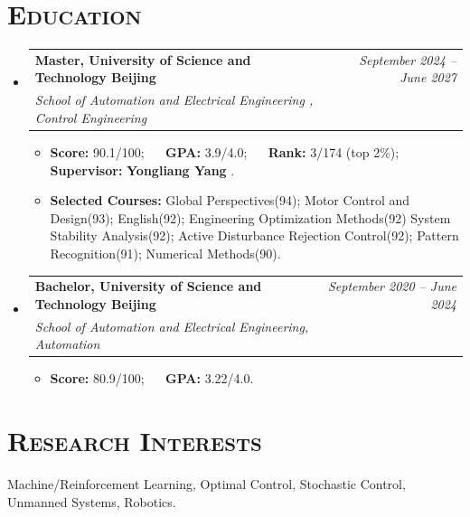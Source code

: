 \documentclass[a4paper,11pt]{article}
\makeatletter
\newcommand{\TT}[1]{\textcolor{black}{#1}}
\newcommand{\externallink}[2]{%
	#2\nobreak\hspace{0.16em}%
	\href{#1}{\textcolor{ExternalArrowColor}{%
			\faIcon{external-link-alt}}}%
}
\newcommand{\resumeItem}[1]{
  \item\small{
    {#1 \vspace{-1pt}}
  }
}
\newcommand{\resumeSubheading}[4]{
  \vspace{-1pt}\item
    \begin{tabular*}{\textwidth}[t]{l@{\extracolsep{\fill}}r}
      \textbf{#1} & {\color{dark-grey}\small #2}\vspace{1pt}\\
      \textit{#3} & {\color{dark-grey} \small #4}\\
    \end{tabular*}\vspace{-4pt}
}
\newcommand{\resumeSubHeadingListStart}{\begin{itemize}[leftmargin=0in, label={}]}
\newcommand{\resumeSubHeadingListEnd}{\end{itemize}}
\newcommand{\resumeItemListStart}{\begin{itemize}}
\newcommand{\resumeItemListEnd}{\end{itemize}\vspace{0pt}}
\makeatother
\begin{document}
\section{\textsc{\Large{Education}}}
  \resumeSubHeadingListStart
    \resumeSubheading
      {Master, \externallink{https://en.ustb.edu.cn/}{University of Science and Technology Beijing}}{\textit{September 2024 -- June 2027}}
      {\externallink{https://ensaee.ustb.edu.cn/}{School of Automation and Electrical Engineering}, Control Engineering}{}
      \resumeItemListStart
        \resumeItem{
        	\textbf{Score:} 90.1/100; $\quad$ 
        	\textbf{GPA:} 3.9/4.0; $\quad$
        	\textbf{Rank:} 3/174 (top 2\%); $\quad$
        	\textbf{Supervisor:} \externallink{https://sites.google.com/view/yongliangyang}{\textbf{Yongliang Yang}}.}  
        \resumeItem{\textbf{Selected Courses:}
        Global Perspectives(94);
        Motor Control and Design(93);
        English(92);
        Engineering Optimization Methods(92)
        System Stability Analysis(92);
        Active Disturbance Rejection Control(92);
        Pattern Recognition(91);
        Numerical Methods(90).
        }
      \resumeItemListEnd

    \resumeSubheading
      {Bachelor, University of Science and Technology Beijing}{\textit{September 2020 -- June 2024}}
      {School of Automation and Electrical Engineering, Automation}{}
            \resumeItemListStart
      \resumeItem{
      	\textbf{Score:} 80.9/100; $\quad$ 
      	\textbf{GPA:} 3.22/4.0. $\quad$}
      \resumeItemListEnd
  \resumeSubHeadingListEnd

%
%
%
%



\section{\textsc{\Large{Research Interests}}}
 \begin{itemize}[leftmargin=0in, label={}]
    \small{\item{
      Machine/Reinforcement Learning, Optimal Control, Stochastic Control, Unmanned Systems, Robotics.
    }}
 \end{itemize}
\end{document}
